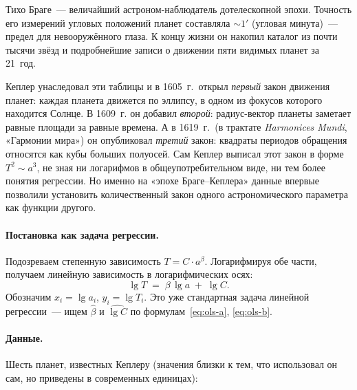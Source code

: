 \begin{historybox}
Тихо Браге~--- величайший астроном-наблюдатель дотелескопной эпохи.
Точность его измерений угловых положений планет составляла $\sim\!1'$
(угловая минута)~--- предел для невооружённого глаза. К концу жизни он
накопил каталог из почти тысячи звёзд и подробнейшие записи о
движении пяти видимых планет за 21~год.

Кеплер унаследовал эти таблицы и в 1605~г.\ открыл \emph{первый} закон
движения планет: каждая планета движется по эллипсу, в одном из фокусов
которого находится Солнце. В 1609~г. он добавил \emph{второй}: радиус-вектор
планеты заметает равные площади за равные времена. А в 1619~г.\
(в трактате \emph{Harmonices Mundi}, «Гармонии мира») он опубликовал
\emph{третий} закон: квадраты периодов обращения относятся как кубы
больших полуосей. Сам Кеплер выписал этот закон в форме
$T^{2}\sim a^{3}$, не зная ни логарифмов в общеупотребительном виде, ни
тем более понятия регрессии. Но именно на «эпохе Браге–Кеплера»
данные впервые позволили установить количественный закон одного
астрономического параметра как функции другого.
\end{historybox}

\paragraph{Постановка как задача регрессии.}
Подозреваем степенную зависимость $T=C\cdot a^{\beta}$. Логарифмируя
обе части, получаем линейную зависимость в логарифмических осях:
\begin{equation}\label{eq:kepler-log}
\lg T\;=\;\beta\,\lg a\;+\;\lg C.
\end{equation}
Обозначим $x_i=\lg a_i$, $y_i=\lg T_i$. Это уже стандартная задача
линейной регрессии~--- ищем $\hat\beta$ и $\widehat{\lg C}$ по
формулам~\eqref{eq:ols-a}, \eqref{eq:ols-b}.

\paragraph{Данные.} Шесть планет, известных Кеплеру (значения близки
к тем, что использовал он сам, но приведены в современных единицах):

